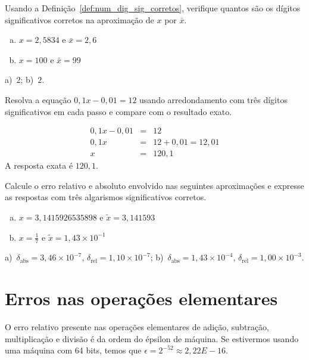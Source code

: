 \begin{exer}
Usando a Definição~\ref{def:num_dig_sig_corretos}, verifique quantos são os dígitos significativos corretos na aproximação de $x$ por $\bar{x}$.
\begin{enumerate}[a)]
\item $x=2,5834$ e $\bar{x}=2,6$
\item $x=100$ e $\bar{x}=99$
\end{enumerate}
\end{exer}
\begin{resp}
  a)~$2$; b)~$2$.
\end{resp}

\begin{exer} Resolva a equação $0,1x-0,01=12$ usando arredondamento com três dígitos significativos em cada passo e compare com o resultado exato.
\end{exer}
\begin{resp}
 \begin{eqnarray*}
  0,1x-0,01&=&12\\
  0,1x&=&12+0,01=12,01\\
  x&=&120,1
 \end{eqnarray*}
A resposta exata é $120,1$.
\end{resp}


\begin{exer} Calcule o erro relativo e absoluto envolvido nas seguintes aproximações e expresse as respostas com três algarismos significativos corretos.
    \begin{enumerate}[a)]
    \item $x=3,1415926535898$ e $\tilde{x}=3,141593$
    \item $x=\frac{1}{7}$ e $\tilde{x}=1,43\times 10^{-1}$
    \end{enumerate}
\end{exer}
\begin{resp}
    a)~$\delta_{\mbox{abs}}=3,46\times 10^{-7}$, $\delta_{\mbox{rel}}=1,10\times 10^{-7}$; b)~$\delta_{\mbox{abs}}=1,43\times 10^{-4}$, $\delta_{\mbox{rel}} = 1,00 \times 10^{-3}$.
\end{resp}



\section{Erros nas operações elementares}
O erro relativo presente nas operações elementares de adição, subtração, multiplicação e divisão é da ordem do épsilon de máquina. Se estivermos usando uma máquina com 64 bits, temos que $\epsilon = 2^{-52} \approx 2,22E-16$.

